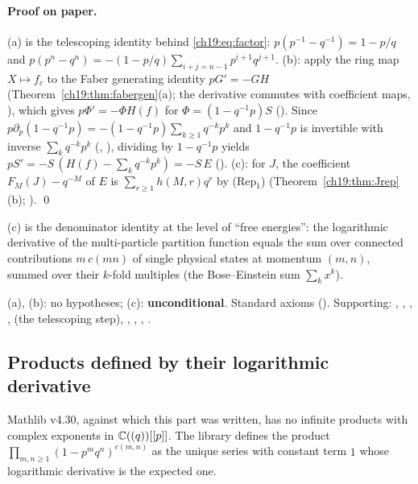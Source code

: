 \paragraph{Proof on paper.}  (a) is the telescoping identity behind \eqref{ch19:eq:factor}:
$p(p^{-1}-q^{-1})=1-p/q$ and $p(p^n-q^n)=-(1-p/q)\sum_{i+j=n-1}p^{i+1}q^{j+1}$.  (b): apply the ring map $X\mapsto f_c$ to the
Faber generating identity $pG'=-GH$ (Theorem~\ref{ch19:thm:fabergen}(a); the derivative commutes with coefficient maps,
), which gives $p\Phi'=-\Phi H(f)$ for $\Phi=(1-q^{-1}p)S$ ().  Since
$p\partial_p(1-q^{-1}p)=-(1-q^{-1}p)\sum_{k\ge1}q^{-k}p^k$ and $1-q^{-1}p$ is invertible with inverse
$\sum_kq^{-k}p^k$ (, ), dividing by $1-q^{-1}p$ yields
$pS'=-S\,(H(f)-\sum_kq^{-k}p^k)=-S\,E$ ().  (c): for $J$, the coefficient $F_M(J)-q^{-M}$ of $E$ is
$\sum_{r\ge1}h(M,r)q^r$ by (Rep$_1$) (Theorem~\ref{ch19:thm:Jrep}(b); ). \qed
\begin{physics}
(c) is the denominator identity at the level of ``free energies'': the logarithmic derivative of the multi-particle
partition function equals the sum over connected contributions $m\,c(mn)$ of single physical states at momentum
$(m,n)$, summed over their $k$-fold multiples (the Bose--Einstein sum $\sum_kx^k$).
\end{physics}
\begin{status}
(a), (b): no hypotheses; (c): \textbf{unconditional}.  Standard axioms ().  Supporting:
, , , ,
 (the telescoping step), , , ,
.
\end{status}

\subsection{Products defined by their logarithmic derivative}

Mathlib v4.30, against which this part was written, has no infinite products with complex exponents in
${\mathbb{C}}((q))[[p]]$.  The library defines the product
$\prod_{m,n\ge1}(1-p^mq^n)^{e(m,n)}$ as the unique series with constant term $1$ whose logarithmic derivative is the
expected one.


